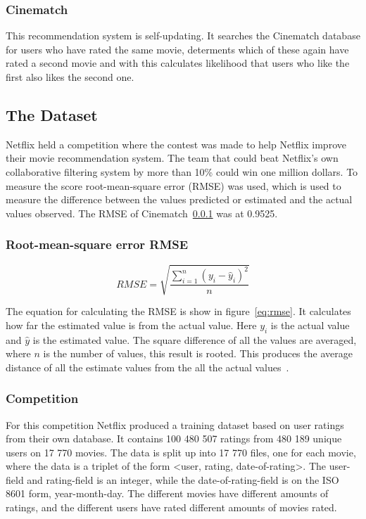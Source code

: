 \subsubsection{Cinematch}
\label{subsec:Cinematch}
This recommendation system is self-updating. It searches the Cinematch database for users who have rated the same movie, determents which of these again have rated a second movie and with this calculates likelihood that users who like the first also likes the second one.


\subsection{The Dataset}\label{subsec:netflixdata}
Netflix held a competition where the contest was made to help Netflix improve their movie recommendation system. The team that could beat Netflix's own collaborative filtering system by more than 10\% could win one million dollars. To measure the score root-mean-square error (RMSE) was used, which is used to measure the difference between the values predicted or estimated and the actual values observed. The RMSE of Cinematch~\ref{subsec:Cinematch} was at 0.9525.

\subsubsection{Root-mean-square error RMSE}\label{subsubsec:rmse}

\begin{equation}\label{eq:rmse}
RMSE = \sqrt {{\frac{{\sum\limits_{{i = 1}}^n {{{\left( {{y_i} - {{\hat{y}}_i}} \right)}^2}} }}{{n}}}}
\end{equation}

The equation for calculating the RMSE is show in figure~\ref{eq:rmse}. It calculates how far the estimated value is from the actual value. Here ${y_i}$ is the actual value and ${\hat{y}}$ is the estimated value. The square difference of all the values are averaged, where ${n}$ is the number of values, this result is rooted. This produces the average distance of all the estimate values from the all the actual values~\cite{rmse}.


\subsubsection{Competition}

For this competition Netflix produced a training dataset based on user ratings from their own database. It contains 100 480 507 ratings from 480 189 unique users on 17 770 movies. The data is split up into 17 770 files, one for each movie, where the data is a triplet of the form <user, rating, date-of-rating>. The user-field and rating-field is an integer, while the date-of-rating-field is on the ISO 8601 form, year-month-day. The different movies have different amounts of ratings, and the different users have rated different amounts of movies rated.

